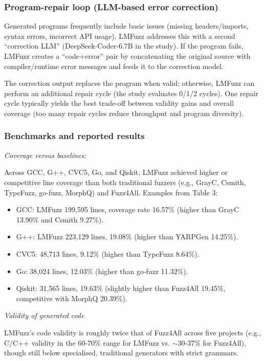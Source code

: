 \subsubsection{Program-repair loop (LLM-based error correction)}

Generated programs frequently include basic issues (missing headers/imports, syntax errors, incorrect API usage). LMFuzz addresses this with a second ``correction LLM'' (DeepSeek-Coder-6.7B in the study). If the program fails, LMFuzz creates a ``code+error'' pair by concatenating the original source with compiler/runtime error messages and feeds it to the correction model.

The correction output replaces the program when valid; otherwise, LMFuzz can perform an additional repair cycle (the study evaluates 0/1/2 cycles). One repair cycle typically yields the best trade-off between validity gains and overall coverage (too many repair cycles reduce throughput and program diversity).

\subsubsection{Benchmarks and reported results}

\lilspace
\textit{Coverage versus baselines:}

Across GCC, G++, CVC5, Go, and Qiskit, LMFuzz achieved higher or competitive line coverage than both traditional fuzzers (e.g., GrayC, Csmith, TypeFuzz, go-fuzz, MorphQ) and Fuzz4All. Examples from Table 3:

\begin{itemize}
    \item GCC: LMFuzz 199,595 lines, coverage rate 16.57\% (higher than GrayC 13.90\% and Csmith 9.27\%).
    \item G++: LMFuzz 223,129 lines, 19.08\% (higher than YARPGen 14.25\%).
    \item CVC5: 48,713 lines, 9.12\% (higher than TypeFuzz 8.64\%).
    \item Go: 38,024 lines, 12.03\% (higher than go-fuzz 11.32\%).
    \item Qiskit: 31,565 lines, 19.63\% (slightly higher than Fuzz4All 19.45\%, competitive with MorphQ 20.39\%).
\end{itemize}

\lilspace
\textit{Validity of generated code}

LMFuzz's code validity is roughly twice that of Fuzz4All across five projects (e.g., C/C++ validity in the 60-70\% range for LMFuzz vs. $\sim$30-37\% for Fuzz4All), though still below specialised, traditional generators with strict grammars.

